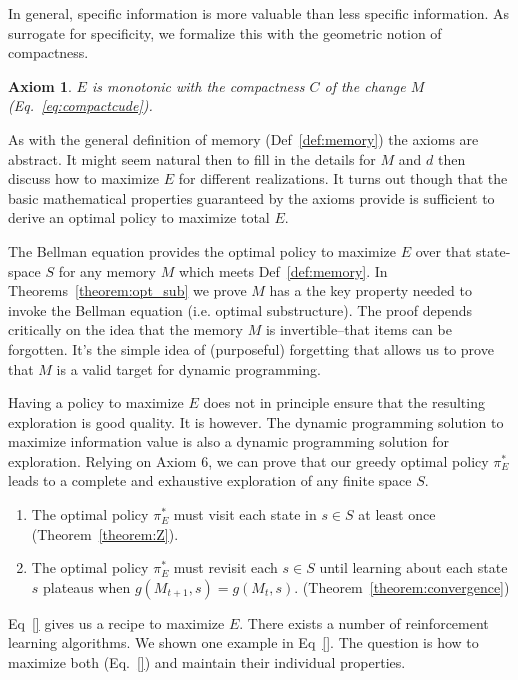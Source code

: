 \documentclass[9pt,twocolumn,twoside]{pnas-new}
\newtheorem{axiom}{Axiom}
\begin{document}
In general, specific information is more valuable than less specific information. As surrogate for specificity, we formalize this with the geometric notion of compactness.
\begin{axiom}
    $E$ is monotonic with the compactness $C$ of the change $M$ (Eq.~\ref{eq:compactcude}).
    \label{ax:5}
\end{axiom}
\noindent


As with the general definition of memory (Def~\ref{def:memory}) the axioms are abstract. It might seem natural then to fill in the details for $M$ and $d$ then discuss how to maximize $E$ for different realizations. It turns out though that the basic mathematical properties guaranteed by the axioms provide is sufficient to derive an optimal policy to maximize total $E$. 

The Bellman equation provides the optimal policy to maximize $E$ over that state-space $S$ for any memory $M$ which meets Def~\ref{def:memory}. In Theorems~\ref{theorem:opt_sub} we prove $M$ has a the key property needed to invoke the Bellman equation (i.e. optimal substructure). The proof depends critically on the idea that the memory $M$ is invertible--that items can be forgotten. It's the simple idea of (purposeful) forgetting that allows us to prove that $M$ is a valid target for dynamic programming.


Having a policy to maximize $E$ does not in principle ensure that the resulting exploration is good quality. It is however. The dynamic programming solution to maximize information value is also a dynamic programming solution for exploration. Relying on Axiom 6, we can prove that our greedy optimal policy $\pi^*_E$ leads to a complete and exhaustive exploration of any finite space $S$.

\begin{enumerate}[noitemsep,wide=0pt,leftmargin=\dimexpr\labelwidth+2\labelsep\relax]
    \item The optimal policy $\pi^*_E$ must visit each state in $s \in S$ at least once (Theorem~\ref{theorem:Z}).
    \item The optimal policy $\pi^*_E$ must revisit each $s \in S$ until learning about each state $s$ plateaus when $g(M_{t+1}, s) = g(M_{t},s)$. (Theorem~\ref{theorem:convergence})
\end{enumerate}

Eq~\ref{} gives us a recipe to maximize $E$. There exists a number of reinforcement learning algorithms. We shown one example in Eq~\ref{}. The question is how to maximize both (Eq.~\ref{}) and maintain their individual properties.
\end{document}
